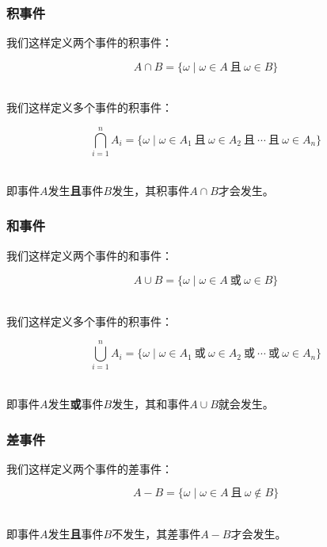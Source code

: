 \documentclass[UTF8]{ctexart}
\begin{document}
\subsubsection{积事件}
    我们这样定义两个事件的积事件：
    \begin{large}
        \begin{equation*}
            A\cap B=\{\omega\mid \omega\in A~\text{且}~\omega\in B\}    
        \end{equation*}
    \end{large}\\
    我们这样定义多个事件的积事件：
    \begin{large}
        \begin{equation*}
            \bigcap_{i=1}^{n}A_i=\{\omega\mid \omega\in A_1~\text{且}~\omega\in A_2~\text{且}~\cdots~\text{且}~\omega\in A_n\}
        \end{equation*}
    \end{large}\\
    即事件$A$发生\textbf{且}事件$B$发生，其积事件$A\cap B$才会发生。\\

\subsubsection{和事件}
    我们这样定义两个事件的和事件：
    \begin{large}
        \begin{equation*}
            A\cup B=\{\omega\mid \omega\in A~\text{或}~\omega\in B\}    
        \end{equation*}
    \end{large}\\
    我们这样定义多个事件的积事件：
    \begin{large}
        \begin{equation*}
            \bigcup_{i=1}^{n}A_i=\{\omega\mid \omega\in A_1~\text{或}~\omega\in A_2~\text{或}~\cdots~\text{或}~\omega\in A_n\}
        \end{equation*}
    \end{large}\\
    即事件$A$发生\textbf{或}事件$B$发生，其和事件$A\cup B$就会发生。

\newpage

\subsubsection{差事件}
    我们这样定义两个事件的差事件：
    \begin{large}
        \begin{equation*}
            A-B=\{\omega\mid \omega\in A~\text{且}~\omega\notin B\}    
        \end{equation*}
    \end{large}\\
    即事件$A$发生\textbf{且}事件$B$不发生，其差事件$A-B$才会发生。\\
\end{document}
